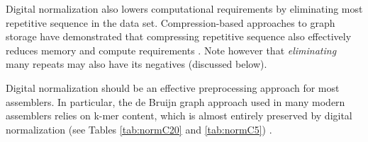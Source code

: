 \documentclass{pnastwo}
\begin{document}
\begin{article}
Digital normalization also lowers computational requirements by
eliminating most repetitive sequence in the data set.
Compression-based approaches to graph storage have demonstrated that
compressing repetitive sequence also effectively reduces memory and
compute requirements \cite{pubmed22139935,pubmed22156294}.  Note
however that {\em eliminating} many repeats may also have its
negatives (discussed below).

Digital normalization should be an effective preprocessing approach
for most assemblers.  In particular, the de Bruijn graph approach used
in many modern assemblers relies on k-mer content, which is almost
entirely preserved by digital normalization (see Tables \ref{tab:normC20}
and \ref{tab:normC5}) \cite{pubmed20211242}.






\end{article}
\end{document}
